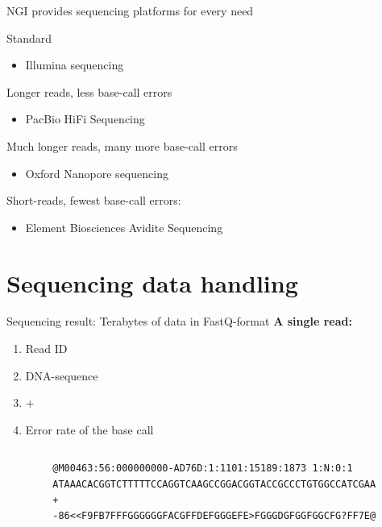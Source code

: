 \documentclass[10pt]{beamer}
\newcommand{\feature}[1]{{\color{scLime} \textbf{#1}}}
\begin{document}
\begin{frame}{NGI provides sequencing platforms for every need}
	\begin{exampleblock}{Standard}
		\begin{itemize}
			\item Illumina sequencing
		\end{itemize}
	\end{exampleblock}
	\begin{alertblock}{Longer reads, less base-call errors}
	\begin{itemize}
		\item PacBio HiFi Sequencing
	\end{itemize}
\end{alertblock}
	\begin{alertblock}{Much longer reads, many more base-call errors}
	\begin{itemize}
		\item Oxford Nanopore sequencing
	\end{itemize}
\end{alertblock}
	\begin{alertblock}{Short-reads, fewest base-call errors:}
		\begin{itemize}
			\item Element Biosciences Avidite Sequencing
		\end{itemize}
	\end{alertblock}
\end{frame}


\section{Sequencing data handling}


\begin{frame}[fragile]{Sequencing result: Terabytes of data in FastQ-format}
	\feature{A single read:}
	\begin{enumerate}
		\item Read ID
		\item DNA-sequence
		\item +
		\item Error rate of the base call
	\end{enumerate}
	\vspace{1em}
	\hrulefill
	\vspace{1em}
	\begin{columns}[T]
		\column{\dimexpr\paperwidth-10pt}
	\begin{lstlisting}
		@M00463:56:000000000-AD76D:1:1101:15189:1873 1:N:0:1
		ATAAACACGGTCTTTTTCCAGGTCAAGCCGGACGGTACCGCCCTGTGGCCATCGAA
		+
		-86<<F9FB7FFFGGGGGGFACGFFDEFGGGEFE>FGGGDGFGGFGGCFG?FF7E@
	\end{lstlisting}
 \end{columns}
\end{frame}
\end{document}
